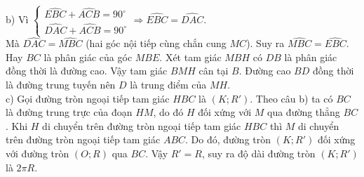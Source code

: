\begin{ex}
{{}{}
\noindent b) Vì $\begin{cases}
\widehat{EBC}+\widehat{ACB}=90^{\circ}\\\widehat{DAC}+\widehat{ACB}=90^{\circ}
\end{cases} \Rightarrow \widehat{EBC}=\widehat{DAC}$.\\			
Mà $\widehat{DAC}=\widehat{MBC}$ (hai góc nội tiếp cùng chắn cung $ MC $). Suy ra $\widehat{MBC}=\widehat{EBC}$.\\
Hay $ BC $ là phân giác của góc $ MBE $. Xét tam giác $ MBH $ có $ DB $ là phân giác đồng thời là đường cao. Vậy tam giác $ BMH $ cân tại $ B $. Đường cao $ BD $ đồng thời là đường trung tuyến nên $ D $ là trung điểm của $ MH $.\\
c) Gọi đường tròn ngoại tiếp tam giác $ HBC $ là $ (K;R') $. Theo câu b) ta có $ BC $ là đường trung trực của đoạn $ HM $, do đó $ H $ đối xứng với $ M $ qua đường thẳng $ BC $. Khi $ H $ di chuyển trên đường tròn ngoại tiếp tam giác $ HBC $ thì $ M $ di chuyển trên đường tròn ngoại tiếp tam giác $ ABC $. Do đó, đường tròn $ (K;R') $ đối xứng với đường tròn $ (O;R) $ qua $ BC $. Vậy $ R'=R $, suy ra độ dài đường tròn $ (K;R') $ là $ 2\pi R $.}
\end{ex}
